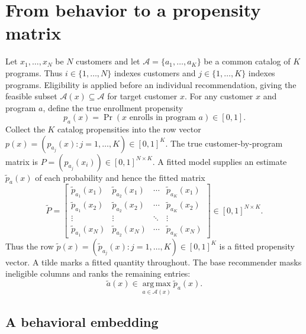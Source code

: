\documentclass[11pt]{article}
\theoremstyle{noteplain}
\theoremstyle{definition}
\newcommand{\cA}{\mathcal A}
\newcommand{\argmax}{\operatorname*{arg\,max}}
\begin{document}
\section{From behavior to a propensity matrix}

Let $x_1,\ldots,x_N$ be $N$ customers and let $\cA=\{a_1,\ldots,a_K\}$ be a common catalog of $K$ programs. Thus $i\in\{1,\ldots,N\}$ indexes customers and $j\in\{1,\ldots,K\}$ indexes programs. Eligibility is applied before an individual recommendation, giving the feasible subset $\cA(x)\subseteq\cA$ for target customer $x$. For any customer $x$ and program $a$, define the true enrollment propensity
\[
 p_a(x)=\Pr(\text{$x$ enrolls in program $a$})\in[0,1].
\]
Collect the $K$ catalog propensities into the row vector $p(x)=(p_{a_j}(x):j=1,\ldots,K)\in[0,1]^K$. The true customer-by-program matrix is $P=(p_{a_j}(x_i))\in[0,1]^{N\times K}$. A fitted model supplies an estimate $\widetilde p_a(x)$ of each probability and hence the fitted matrix
\[
\widetilde P=
\begin{bmatrix}
\widetilde p_{a_1}(x_1)&\widetilde p_{a_2}(x_1)&\cdots&\widetilde p_{a_K}(x_1)\\
\widetilde p_{a_1}(x_2)&\widetilde p_{a_2}(x_2)&\cdots&\widetilde p_{a_K}(x_2)\\
\vdots&\vdots&\ddots&\vdots\\
\widetilde p_{a_1}(x_N)&\widetilde p_{a_2}(x_N)&\cdots&\widetilde p_{a_K}(x_N)
\end{bmatrix}\in[0,1]^{N\times K}.
\]
Thus the row $\widetilde p(x)=(\widetilde p_{a_j}(x):j=1,\ldots,K)\in[0,1]^K$ is a fitted propensity vector. A tilde marks a fitted quantity throughout. The base recommender masks ineligible columns and ranks the remaining entries:
\begin{equation}\label{eq:base-rank}
 \widetilde a(x)\in\argmax_{a\in\cA(x)}\widetilde p_a(x).
\end{equation}

\subsection{A behavioral embedding}
\end{document}
